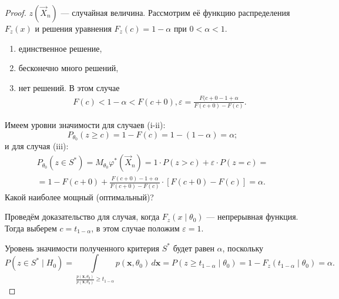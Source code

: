 \begin{proof}
$ z(\vec X_n) $ --- случайная величина. Рассмотрим её функцию распределения $
F_z(x) $ и решения уравнения $ F_z(c) = 1-\alpha $ при $ 0 < \alpha < 1 $.
\begin{enumerate}[label=(\roman*)]	
	\item единственное решение,

	\item бесконечно много решений,

	\item нет решений.
		В этом случае  
		\begin{gather*}
				F(c) < 1 - \alpha < F(c+0),
				\varepsilon = \frac{F(c+0 - 1 + \alpha}{F(c+0) - F(c)}.
		\end{gather*}
\end{enumerate}

Имеем уровни значимости для случаев (i-ii): 
\[
	P_{\theta_0} (z \geqslant c) = 1 - F(c) = 1 - (1 - \alpha) =
	\alpha;
\]
и для случая (iii):
\begin{multline*}
	P_{\theta_0}(z\in S^\ast) = M_{\theta_0} \varphi^\ast(\vec
	X_n) = 1 \cdot P(z > c) + \varepsilon \cdot P(z = c) =\\= 1 - F(c + 0) +
	\frac{F(c+0) - 1 + \alpha}{F(c+0) - F(c)}\cdot \left[ F(c+0) - F(c) \right] =
	\alpha.
\end{multline*}
Какой наиболее мощный (оптимальный)?

Проведём доказательство для случая, когда $ F_z(x\mid \theta_0) $ ---
непрерывная функция. Тогда выберем $ c = t_{1-\alpha} $, в этом случае положим
$ \varepsilon = 1 $.

Уровень значимости полученного критерия $ S^\ast $ будет равен $ \alpha $,
поскольку  
\[
		P(z\in S^\ast \mid H_0) = \int\limits_{\frac{p(\mathbf x,
		\theta_0)}{p(\mathbf x, \theta_0)} \geqslant t_{1-\alpha}} p(\mathbf x,
		\theta_0) \,d\mathbf x = P(z \geqslant t_{1-\alpha} \mid \theta_0) = 1 -
		F_z(t_{1-\alpha} \mid \theta_0) = \alpha.
\]


\end{proof}
